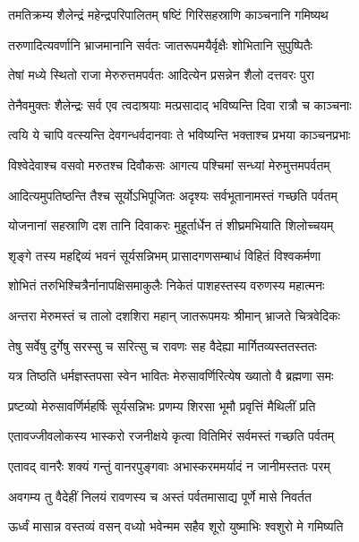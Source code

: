 \twolineshloka
{तमतिक्रम्य शैलेन्द्रं महेन्द्रपरिपालितम्}
{षष्टिं गिरिसहस्राणि काञ्चनानि गमिष्यथ} %

\twolineshloka
{तरुणादित्यवर्णानि भ्राजमानानि सर्वतः}
{जातरूपमयैर्वृक्षैः शोभितानि सुपुष्पितैः} %

\twolineshloka
{तेषां मध्ये स्थितो राजा मेरुरुत्तमपर्वतः}
{आदित्येन प्रसन्नेन शैलो दत्तवरः पुरा} %

\twolineshloka
{तेनैवमुक्तः शैलेन्द्रः सर्व एव त्वदाश्रयाः}
{मत्प्रसादाद् भविष्यन्ति दिवा रात्रौ च काञ्चनाः} %

\twolineshloka
{त्वयि ये चापि वत्स्यन्ति देवगन्धर्वदानवाः}
{ते भविष्यन्ति भक्ताश्च प्रभया काञ्चनप्रभाः} %

\twolineshloka
{विश्वेदेवाश्च वसवो मरुतश्च दिवौकसः}
{आगत्य पश्चिमां सन्ध्यां मेरुमुत्तमपर्वतम्} %

\twolineshloka
{आदित्यमुपतिष्ठन्ति तैश्च सूर्योऽभिपूजितः}
{अदृश्यः सर्वभूतानामस्तं गच्छति पर्वतम्} %

\twolineshloka
{योजनानां सहस्राणि दश तानि दिवाकरः}
{मुहूर्तार्धेन तं शीघ्रमभियाति शिलोच्चयम्} %

\twolineshloka
{शृङ्गे तस्य महद्दिव्यं भवनं सूर्यसन्निभम्}
{प्रासादगणसम्बाधं विहितं विश्वकर्मणा} %

\twolineshloka
{शोभितं तरुभिश्चित्रैर्नानापक्षिसमाकुलैः}
{निकेतं पाशहस्तस्य वरुणस्य महात्मनः} %

\twolineshloka
{अन्तरा मेरुमस्तं च तालो दशशिरा महान्}
{जातरूपमयः श्रीमान् भ्राजते चित्रवेदिकः} %

\twolineshloka
{तेषु सर्वेषु दुर्गेषु सरस्सु च सरित्सु च}
{रावणः सह वैदेह्या मार्गितव्यस्ततस्ततः} %

\twolineshloka
{यत्र तिष्ठति धर्मज्ञस्तपसा स्वेन भावितः}
{मेरुसावर्णिरित्येष ख्यातो वै ब्रह्मणा समः} %

\twolineshloka
{प्रष्टव्यो मेरुसावर्णिर्महर्षिः सूर्यसन्निभः}
{प्रणम्य शिरसा भूमौ प्रवृत्तिं मैथिलीं प्रति} %

\twolineshloka
{एतावज्जीवलोकस्य भास्करो रजनीक्षये}
{कृत्वा वितिमिरं सर्वमस्तं गच्छति पर्वतम्} %

\twolineshloka
{एतावद् वानरैः शक्यं गन्तुं वानरपुङ्गवाः}
{अभास्करममर्यादं न जानीमस्ततः परम्} %

\twolineshloka
{अवगम्य तु वैदेहीं निलयं रावणस्य च}
{अस्तं पर्वतमासाद्य पूर्णे मासे निवर्तत} %

\twolineshloka
{ऊर्ध्वं मासान्न वस्तव्यं वसन् वध्यो भवेन्मम}
{सहैव शूरो युष्माभिः श्वशुरो मे गमिष्यति} %

